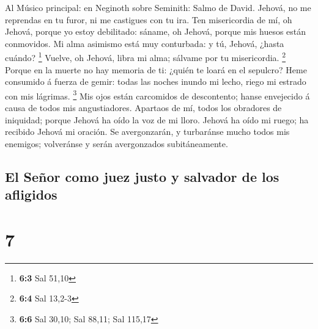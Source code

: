  Al Músico principal: en Neginoth sobre Seminith: Salmo de
David. Jehová, no me reprendas en tu furor, ni me castigues con tu ira.
 Ten misericordia de mí, oh Jehová, porque yo estoy
debilitado: sáname, oh Jehová, porque mis huesos están conmovidos.
 Mi alma asimismo está muy conturbada: y tú, Jehová, ¿hasta
cuándo? \footnote{\textbf{6:3} Sal 51,10}  Vuelve, oh
Jehová, libra mi alma; sálvame por tu misericordia. \footnote{\textbf{6:4}
  Sal 13,2-3}  Porque en la muerte no hay memoria de ti:
¿quién te loará en el sepulcro?  Heme consumido á fuerza de
gemir: todas las noches inundo mi lecho, riego mi estrado con mis
lágrimas. \footnote{\textbf{6:6} Sal 30,10; Sal 88,11; Sal 115,17}
 Mis ojos están carcomidos de descontento; hanse envejecido
á causa de todos mis angustiadores.  Apartaos de mí, todos
los obradores de iniquidad; porque Jehová ha oído la voz de mi lloro.
 Jehová ha oído mi ruego; ha recibido Jehová mi oración.
 Se avergonzarán, y turbaránse mucho todos mis enemigos;
volveránse y serán avergonzados subitáneamente.

\hypertarget{el-seuxf1or-como-juez-justo-y-salvador-de-los-afligidos}{%
\subsection{El Señor como juez justo y salvador de los
afligidos}\label{el-seuxf1or-como-juez-justo-y-salvador-de-los-afligidos}}

\hypertarget{section-6}{%
\section{7}\label{section-6}}

